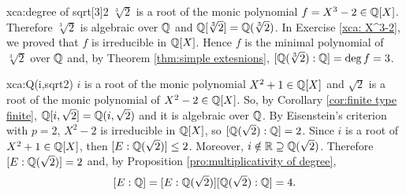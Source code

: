 \begin{sol}{xca:degree of sqrt[3]2}
    $\sqrt[3]{2}$ is a root of the monic polynomial $f=X^3-2\in \mathbb{Q}[X]$.
    Therefore $\sqrt[3]{2}$ is algebraic over $\mathbb{Q}$ 
    and $\mathbb{Q}[\sqrt[3]{2}]=\mathbb{Q}(\sqrt[3]{2})$.
    In Exercise \ref{xca: X^3-2}, we proved that
    $f$ is irreducible in $\mathbb{Q}[X]$.
    Hence $f$ is the minimal polynomial of $\sqrt[3]{2}$
    over $\mathbb{Q}$ and, by Theorem \ref{thm:simple extesnions},
    $[\mathbb{Q}(\sqrt[3]{2}):\mathbb{Q}]=\deg f=3$.
\end{sol}

\begin{sol}{xca:Q(i,sqrt2)}
    $i$ is a root of the monic polynomial $X^2+1\in\mathbb{Q}[X]$
    and $\sqrt{2}$ is a root of the monic polynomial of 
    $X^2-2\in\mathbb{Q}[X]$.
    So, by Corollary \ref{cor:finite type finite},
     $\mathbb{Q}[i,\sqrt{2}]=\mathbb{Q}(i,\sqrt{2})$ and it is algebraic over $\mathbb{Q}$.
    By Eisenstein's criterion with $p=2$,
    $X^2-2$ is irreducible in $\mathbb{Q}[X]$, so 
    $[\mathbb{Q}(\sqrt{2}):\mathbb{Q}]=2$.
    Since $i$ is a root of $X^2+1\in\mathbb{Q}[X]$,
    then $[E:\mathbb{Q}(\sqrt{2})]\leq 2$.
    Moreover, $i\notin \mathbb{R}\supseteq \mathbb{Q}(\sqrt{2})$.
    Therefore $[E:\mathbb{Q}(\sqrt{2})]=2$ and,
    by Proposition \ref{pro:multiplicativity of degree},
    \[
    [E:\mathbb{Q}]=[E:\mathbb{Q}(\sqrt{2})][\mathbb{Q}(\sqrt{2}):\mathbb{Q}]=4.
    \]
\end{sol}

